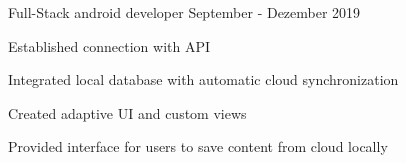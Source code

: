 

\vspace{0cm}\begin{cventries}
	
	
	
	
	\cventry
	{Full-Stack android developer}
	{}
	{}
	{September - Dezember 2019}
	{
		\begin{cvitems}
			\item {Established connection with API}
			\item {Integrated local database with automatic cloud synchronization}
			\item {Created adaptive UI and custom views}
			\item {Provided interface for users to save content from cloud locally}	
			\end{cvitems}
	}


\end{cventries}